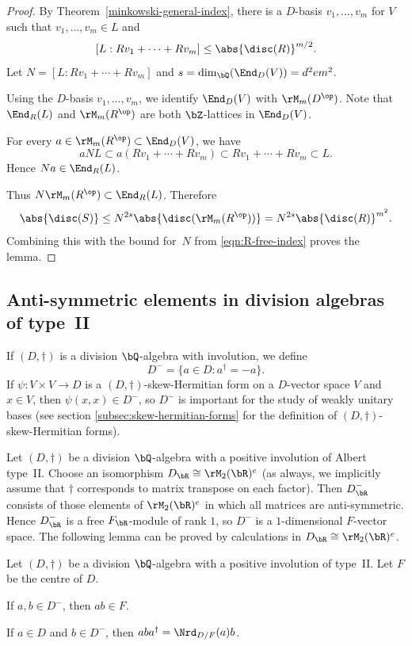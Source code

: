 \begin{proof}
By Theorem~\ref{minkowski-general-index}, there
is a $D$-basis $v_1, \dotsc, v_m$ for $V$ such that \hbox{$v_1, \dotsc, v_m \!\in\! L$} and
\begin{equation} \label{eqn:R-free-index}
[L:Rv_1 + \dotsb + Rv_m] \leq \abs{\disc(R)}^{m/2}.
\end{equation}
Let $N = [L:Rv_1 + \dotsb + Rv_m]$ and $s = \dim_\bQ(\End_D(V)) = d^2em^2$.

Using the $D$-basis $v_1, \dotsc, v_m$, we identify $\End_D(V)$ with $\rM_m(D^\op)$.
Note that $\End_R(L)$ and $\rM_m(R^\op)$ are both $\bZ$-lattices in $\End_D(V)$.

For every $a \in \rM_m(R^\op) \subset \End_D(V)$, we have
\[
aNL \subset a(Rv_1 + \dotsb + Rv_m) \subset Rv_1 + \dotsb + Rv_m \subset L.
\]
Hence $Na \in \End_R(L)$.

Thus $N\rM_m(R^\op) \subset \End_R(L)$.
Therefore
\[
\abs{\disc(S)} \leq N^{2s} \abs{\disc(\rM_m(R^\op))}
= N^{2s} \abs{\disc(R)}^{m^2}.
\]
Combining this with the bound for~$N$ from \eqref{eqn:R-free-index} proves the lemma.
\end{proof}

\subsection{Anti-symmetric elements in division algebras of type~II}

If $(D, \dag)$ is a division $\bQ$-algebra with involution, we define
\[
D^- = \{ a \in D : a^\dag = -a \}.
\]
If $\psi \colon V \times V \to D$ is a $(D,\dag)$-skew-Hermitian form on a $D$-vector space $V$ and $x \in V$, then $\psi(x,x) \in D^-$, so $D^-$ is important for the study of weakly unitary bases (see section \ref{subsec:skew-hermitian-forms} for the definition of $(D,\dag)$-skew-Hermitian forms).

Let $(D,\dag)$ be a division $\bQ$-algebra with a positive involution of Albert type~II.
Choose an isomorphism $D_\bR \cong \rM_2(\bR)^e$ (as always, we implicitly assume that $\dag$ corresponds to matrix transpose on each factor).
Then $D_\bR^-$ consists of those elements of $\rM_2(\bR)^e$ in which all matrices are anti-symmetric.
Hence $D_\bR^-$ is a free $F_\bR$-module of rank $1$, so $D^-$ is a $1$-dimensional $F$-vector space. The following lemma can be proved by calculations in $D_\bR \cong \rM_2(\bR)^e$.

\begin{lemma} \label{action-on-antisymm}
Let $(D, \dag)$ be a division $\bQ$-algebra with a positive involution of type~II.
Let $F$ be the centre of $D$.
\begin{enumeratei}
\item\label{action-on-antisymmi} If $a, b \in D^-$, then $ab \in F$.
\item\label{action-on-antisymmii} If $a \in D$ and $b \in D^-$, then $aba^\dag = \Nrd_{D/F}(a)b$.
\end{enumeratei}
\end{lemma}


